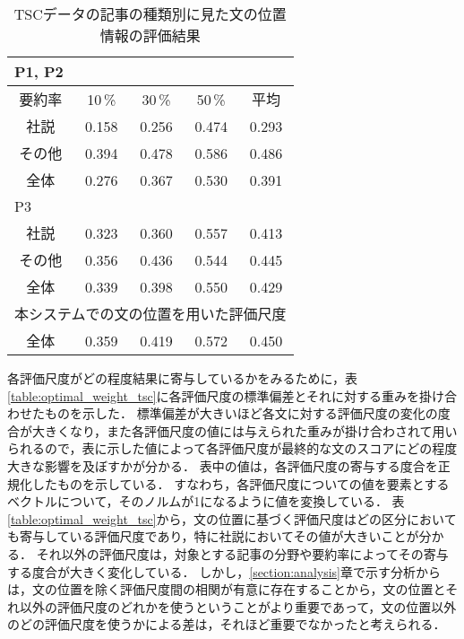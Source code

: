 \begin{table}[t]
\caption{TSCデータの記事の種類別に見た文の位置情報の評価結果}
\begin{center}\label{table:result_tsc_location}
\begin{tabular}{c|ccc|c} \hline
\multicolumn{5}{l}{P1, P2} \\ \hline
要約率 & 10\,\%   & 30\,\%  & 50\,\%  & 平均  \\ \hline
社説   & 0.158  & 0.256 & 0.474 & 0.293 \\
その他 & 0.394  & 0.478 & 0.586 & 0.486 \\
全体   & 0.276  & 0.367 & 0.530 & 0.391 \\ \hline
\multicolumn{5}{l}{P3} \\ \hline
社説   & 0.323  & 0.360 & 0.557 & 0.413 \\
その他 & 0.356  & 0.436 & 0.544 & 0.445 \\
全体   & 0.339  & 0.398 & 0.550 & 0.429 \\ \hline
\multicolumn{5}{l}{本システムでの文の位置を用いた評価尺度} \\ \hline
全体   & 0.359  & 0.419 & 0.572 & 0.450 \\ \hline
\end{tabular}
\end{center}
\end{table}

各評価尺度がどの程度結果に寄与しているかをみるために，表\ref{table:optimal_weight_tsc}に各評価尺度の標準偏差とそれに対する重みを掛け合わせたものを示した．
標準偏差が大きいほど各文に対する評価尺度の変化の度合が大きくなり，また各評価尺度の値には与えられた重みが掛け合わされて用いられるので，表に示した値によって各評価尺度が最終的な文のスコアにどの程度大きな影響を及ぼすかが分かる．
表中の値は，各評価尺度の寄与する度合を正規化したものを示している．
すなわち，各評価尺度についての値を要素とするベクトルについて，そのノルムが1になるように値を変換している．
表\ref{table:optimal_weight_tsc}から，文の位置に基づく評価尺度はどの区分においても寄与している評価尺度であり，特に社説においてその値が大きいことが分かる．
それ以外の評価尺度は，対象とする記事の分野や要約率によってその寄与する度合が大きく変化している．
しかし，\ref{section:analysis}章で示す分析からは，文の位置を除く評価尺度間の相関が有意に存在することから，文の位置とそれ以外の評価尺度のどれかを使うということがより重要であって，文の位置以外のどの評価尺度を使うかによる差は，それほど重要でなかったと考えられる．


